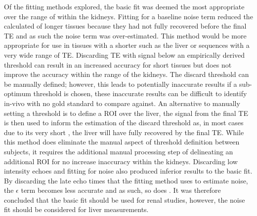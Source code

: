 Of the fitting methods explored, the basic fit was deemed the most appropriate over the range of \ttwo within the kidneys. Fitting for a baseline noise term reduced the calculated \ttwo of longer \ttwo tissues because they had not fully recovered before the final \ac{TE} and as such the noise term was over-estimated. This method would be more appropriate for use in tissues with a shorter \ttwo such as the liver or sequences with a very wide range of \ac{TE}. Discarding \ac{TE} with signal below an empirically derived threshold can result in an increased accuracy for short \ttwo tissues but does not improve the accuracy within the range of the kidneys. The discard threshold can be manually defined; however, this leads to potentially inaccurate results if a sub-optimum threshold is chosen, these inaccurate results can be difficult to identify in-vivo with no gold standard to compare against. An alternative to manually setting a threshold is to define a \ac{ROI} over the liver, the signal from the final \ac{TE} is then used to inform the estimation of the discard threshold as, in most cases due to its very short \ttwo, the liver will have fully recovered by the final \ac{TE}. While this method does eliminate the manual aspect of threshold definition between subjects, it requires the additional manual processing step of delineating an additional \ac{ROI} for no increase inaccuracy within the kidneys. Discarding low intensity echoes and fitting for noise also produced inferior results to the basic fit. By discarding the late echo times that the fitting method uses to estimate noise, the $\epsilon$ term becomes less accurate and as such, so does \ttwo. It was therefore concluded that the basic fit should be used for renal studies, however, the noise fit should be considered for liver \ttwo measurements.

